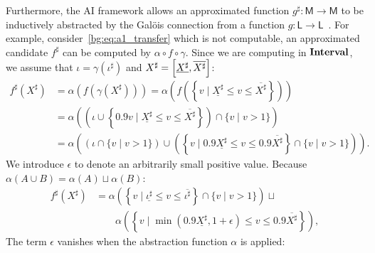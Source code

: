 Furthermore, the AI framework allows an approximated function $g^\sharp:
\mathsf{M} \to \mathsf{M}$ to be inductively abstracted by the Gal\"ois
connection from a function $g: \mathsf{L} \to \mathsf{L}$~\cite{nielson99}.
For example, consider~\eqref{bg:eq:a1_transfer} which is not computable,
an approximated candidate $f^\sharp$ can be computed by $\alpha
\circ f \circ \gamma$.  Since we are computing in $\mathbf{Interval}$,
we assume that $\iota = \gamma(\iota^\sharp)$ and $X^\sharp =
\left[{\underline{X^\sharp}}, {\overline{X^\sharp}}\right]$:
\begin{equation}
    \begin{aligned}
        f^\sharp(X^\sharp)
        &= \alpha \left( f \left(
            \gamma \left( X^\sharp \right)
        \right) \right)
        = \alpha \left( f \left( \left\{
            v \mid \underline{X^\sharp} \leq v \leq \overline{X^\sharp}
        \right\} \right) \right) \\
        &= \alpha \left(
        \left(
            \iota \cup
            \left\{
                0.9 v \mid
                \underline{X^\sharp} \leq v \leq \overline{X^\sharp}
            \right\}
        \right) \cap \{ v \mid v > 1 \} \right) \\
        &= \alpha \left(
            \left( \iota \cap \{ v \mid v > 1 \} \right) \cup
            \left( \left\{
                v \mid
                0.9 \underline{X^\sharp} \leq v \leq 0.9 \overline{X^\sharp}
            \right\} \cap \{ v \mid v > 1 \} \right)
        \right).
    \end{aligned}
\end{equation}
We introduce $\epsilon$ to denote an arbitrarily small positive value.  Because
$\alpha(A \cup B) = \alpha(A) \sqcup \alpha(B)$:
\begin{equation}
    \begin{aligned}
        f^\sharp(X^\sharp)
        &= \alpha \left( \left\{
            v \mid \underline{\iota^\sharp}
                \leq v \leq \overline{\iota^\sharp}
        \right\} \cap \{ v \mid v > 1 \} \right) \sqcup \\
        & \quad\quad
        \alpha \left( \left\{
            v \mid
            \min(0.9 \underline{X^\sharp}, 1 + \epsilon)
                \leq v \leq 0.9 \overline{X^\sharp}
        \right\} \right),
    \end{aligned}
\end{equation}
The term $\epsilon$ vanishes when the abstraction function $\alpha$ is applied:
